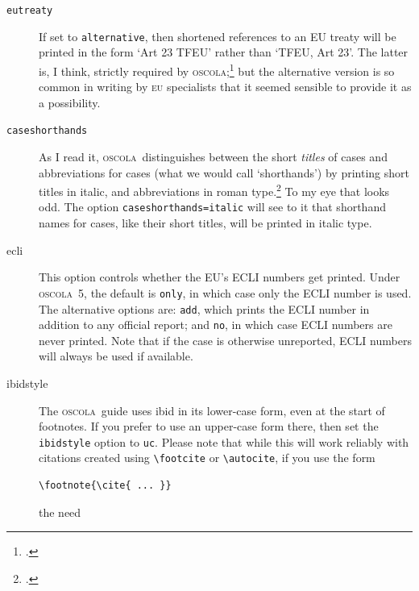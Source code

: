 \documentclass[a4paper,
               11pt,
	       DIV=1,			   
	       footinclude=false]
	      {scrartcl}
\newcommand{\oscolashort}{\textsc{oscola}\nocite{oscola}}
\begin{document}
\begin{description}
\item[\texttt{eutreaty}] If\label{options} set to
  \texttt{alternative}, then shortened references to an EU treaty will
  be printed in the form `Art 23 TFEU' rather than `TFEU, Art 23'. The
  latter is, I think, strictly required by
  \oscolashort;\footcite[29]{oscola} but the alternative version is so
  common in writing by \textsc{eu} specialists that it seemed sensible
  to provide it as a possibility.
\item[\texttt{caseshorthands}]
  As I read it, \oscolashort\ distinguishes between the short
  \emph{titles} of cases and abbreviations for cases (what we would
  call `shorthands') by printing short titles in italic, and
  abbreviations in roman type.\footcite[See `example 4'][15]{oscola}
  To my eye that looks odd. The option \texttt{caseshorthands=italic}
  will see to it that shorthand names for cases, like their short
  titles, will be printed in italic type.
\item[ecli]
   This option controls
  whether the EU's ECLI numbers get printed. Under \oscolashort\ 5, the
  default is \verb|only|, in which case only the ECLI number is used.
  The alternative options are: \verb|add|, which prints the ECLI
  number in addition to any official report; and \verb|no|, in which
  case ECLI numbers are never printed. Note that if the case is
  otherwise unreported, ECLI numbers will always be used if
  available.
\item[ibidstyle]
  The \oscolashort\ guide uses ibid in its lower-case form, even at
  the start of footnotes. If you prefer to use an upper-case form
  there, then set the \texttt{ibidstyle} option to \texttt{uc}. Please
  note that while this will work reliably with citations created using
  \verb|\footcite| or \verb|\autocite|, if you use the
  form
\begin{verbatim}\footnote{\cite{ ... }}\end{verbatim}
  the need

\end{description}
\end{document}
